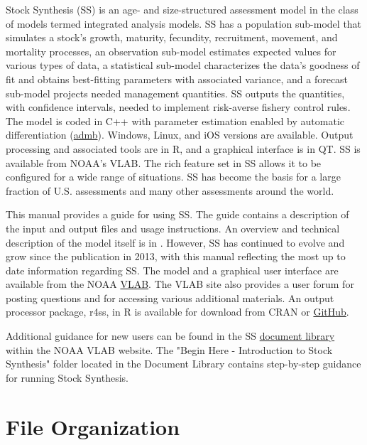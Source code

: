 Stock Synthesis (SS) is an age- and size-structured assessment model in the class of models termed integrated analysis models. SS has a population sub-model that simulates a stock's growth, maturity, fecundity, recruitment, movement, and mortality processes, an observation sub-model estimates expected values for various types of data, a statistical sub-model characterizes the data’s goodness of fit and obtains best-fitting parameters with associated variance, and a forecast sub-model projects needed management quantities.  SS outputs the quantities, with confidence intervals, needed to implement risk-averse fishery control rules. The model is coded in C++ with parameter estimation enabled by automatic differentiation (\href{http://www.admb-project.org}{admb}).  Windows, Linux, and iOS versions are available.  Output processing and associated tools are in R, and a graphical interface is in QT.  SS is available from NOAA’s VLAB. The rich feature set in SS allows it to be configured for a wide range of situations.  SS has become the basis for a large fraction of U.S. assessments and many other assessments around the world.  

This manual provides a guide for using SS. The guide contains a description of the input and output files and usage instructions. An overview and technical description of the model itself is in \citet{methot-stock-2013}. However, SS has continued to evolve and grow since the publication in 2013, with this manual reflecting the most up to date information regarding SS.  The model and a graphical user interface are available from the NOAA \href{https://vlab.noaa.gov/group/stock-synthesis/home}{VLAB}. The VLAB site also provides a user forum for posting questions and for accessing various additional materials.  An output processor package, r4ss, in R is available for download from CRAN or \href{https://github.com/r4ss/r4ss}{GitHub}.

Additional guidance for new users can be found in the SS \href{https://vlab.noaa.gov/group/stock-synthesis/document-library}{document library} within the NOAA VLAB website.  The "Begin Here - Introduction to Stock Synthesis" folder located in the Document Library contains step-by-step guidance for running Stock Synthesis.  

\pagebreak
		
\section{File Organization}\label{FileOrganization}		
